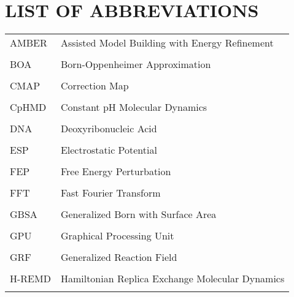 
\chapter*{LIST OF ABBREVIATIONS}

\singlespacing

\begin{tabular}{lp{5in}}

AMBER & Assisted Model Building with Energy Refinement \\ \\

BOA & Born-Oppenheimer Approximation \\ \\

CMAP & Correction Map \\ \\ 

CpHMD & Constant pH Molecular Dynamics \\ \\

DNA & Deoxyribonucleic Acid \\ \\

ESP & Electrostatic Potential \\ \\

FEP & Free Energy Perturbation \\ \\

FFT & Fast Fourier Transform \\ \\

GBSA & Generalized Born with Surface Area \\ \\

GPU & Graphical Processing Unit \\ \\

GRF & Generalized Reaction Field \\ \\

H-REMD & Hamiltonian Replica Exchange Molecular Dynamics \\ \\


\end{tabular}
